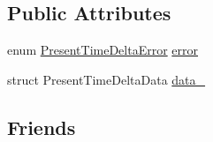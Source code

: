 \subsection*{\-Public \-Attributes}
\begin{DoxyCompactItemize}
\item 
enum \hyperlink{time-delta_8h_a6090105e9137c36754994cda35937b59}{\-Present\-Time\-Delta\-Error} \hyperlink{structTimeDelta_a212d89d50dc636a4e12ceac5fd9f0bfd}{error}
\item 
struct \-Present\-Time\-Delta\-Data \hyperlink{structTimeDelta_ab88989772d6ab486e1e008238d96eb81}{data\-\_\-}
\end{DoxyCompactItemize}
\subsection*{\-Friends}

